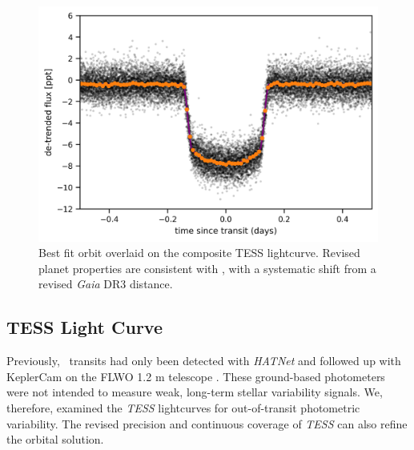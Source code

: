 \documentclass[twocolumn]{aastex631}
\newcommand{\hatpb}{\object{HAT-P-67 b}}
\begin{document}
\begin{figure}
    \includegraphics[width=\linewidth]{figures/best_fit_orbit.png}
    \caption{Best fit orbit overlaid on the composite TESS lightcurve.  Revised planet properties are consistent with \citet{2017AJ....153..211Z}, with a systematic shift from a revised \emph{Gaia} DR3 distance.}
    \label{fig:transit}
\end{figure}

\subsection{TESS Light Curve}
Previously, \hatpb~transits had only been detected with \emph{HATNet} \citep{2004PASP..116..266B} and followed up with KeplerCam on the FLWO 1.2 m telescope \citep{2017AJ....153..211Z}. These ground-based photometers were not intended to measure weak, long-term stellar variability signals.  We, therefore, examined the \emph{TESS} lightcurves for out-of-transit photometric variability.  The revised precision and continuous coverage of \emph{TESS} can also refine the orbital solution.
\end{document}
